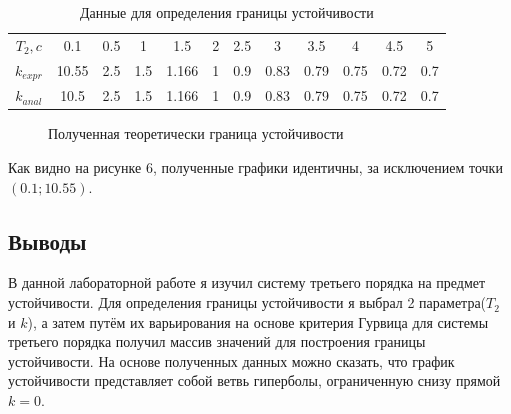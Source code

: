 \documentclass[a4paper, 11pt]{article}
\begin{document}
\begin{table}[h!]
\centering
\begin{threeparttable}
\caption{Данные для определения границы устойчивости}\label{tab:perflogcross}
\begin{tabular}{|c|c|c|c|c|c|c|c|c|c|c|c|}
\hline
$T_2,c$ & 0.1 & 0.5 & 1 & 1.5 & 2 & 2.5 & 3 & 3.5 & 4 & 4.5 & 5\\
\cline{1-12}
$k_{expr}$ & 10.55 & 2.5 & 1.5 & 1.166 & 1 & 0.9 & 0.83 & 0.79 & 0.75 & 0.72 & 0.7\\
\cline{1-12}
$k_{anal}$ & 10.5 & 2.5 & 1.5 & 1.166 & 1 & 0.9 & 0.83 & 0.79 & 0.75 & 0.72 & 0.7\\
\hline

\end{tabular}
\end{threeparttable}
\end{table}

\begin{figure}[h!]
\centering
{}
\caption{Полученная теоретически граница устойчивости}
\end{figure}

\par
Как видно на рисунке 6, полученные графики идентичны, за исключением точки $(0.1;10.55)$.
\newpage
\begin{center}
\section*{Выводы}
\end{center}
\par
В данной лабораторной работе я изучил систему третьего порядка на предмет устойчивости. Для определения границы устойчивости я выбрал 2 параметра($T_2$ и $k$), а затем путём их варьирования на основе критерия Гурвица для системы третьего порядка получил массив значений для построения границы устойчивости. На основе полученных данных можно сказать, что график устойчивости представляет собой ветвь гиперболы, ограниченную снизу прямой $k=0$.
\end{document}
